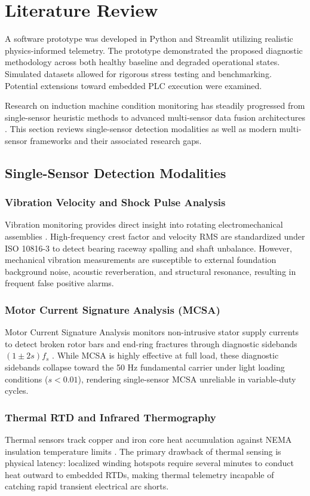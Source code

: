 \documentclass[conference]{IEEEtran}
\begin{document}
\section{Literature Review}
A software prototype was developed in Python and Streamlit utilizing realistic physics-informed telemetry. The prototype demonstrated the proposed diagnostic methodology across both healthy baseline and degraded operational states. Simulated datasets allowed for rigorous stress testing and benchmarking. Potential extensions toward embedded PLC execution were examined.

Research on induction machine condition monitoring has steadily progressed from single-sensor heuristic methods to advanced multi-sensor data fusion architectures \cite{ref6,ref7}. This section reviews single-sensor detection modalities as well as modern multi-sensor frameworks and their associated research gaps.

\subsection{Single-Sensor Detection Modalities}
\subsubsection{Vibration Velocity and Shock Pulse Analysis}
Vibration monitoring provides direct insight into rotating electromechanical assemblies \cite{ref2,ref4}. High-frequency crest factor and velocity RMS are standardized under ISO 10816-3 to detect bearing raceway spalling and shaft unbalance. However, mechanical vibration measurements are susceptible to external foundation background noise, acoustic reverberation, and structural resonance, resulting in frequent false positive alarms.

\subsubsection{Motor Current Signature Analysis (MCSA)}
Motor Current Signature Analysis monitors non-intrusive stator supply currents to detect broken rotor bars and end-ring fractures through diagnostic sidebands $(1 \pm 2s)f_s$ \cite{ref1,ref3}. While MCSA is highly effective at full load, these diagnostic sidebands collapse toward the 50 Hz fundamental carrier under light loading conditions ($s < 0.01$), rendering single-sensor MCSA unreliable in variable-duty cycles.

\subsubsection{Thermal RTD and Infrared Thermography}
Thermal sensors track copper and iron core heat accumulation against NEMA insulation temperature limits \cite{ref1,ref4}. The primary drawback of thermal sensing is physical latency: localized winding hotspots require several minutes to conduct heat outward to embedded RTDs, making thermal telemetry incapable of catching rapid transient electrical arc shorts.
\end{document}
